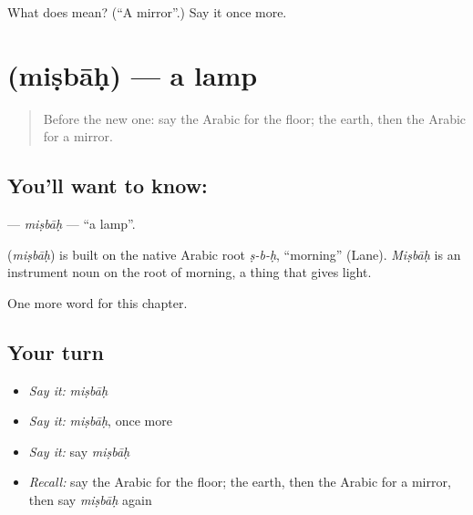\begin{tcolorbox}[breakable,colback=teal!4,colframe=teal!35!black,title={Before you move on}]
What does  mean? (\textquotedblleft{}A mirror\textquotedblright{}.) Say it once more.
\end{tcolorbox}
\section[\texorpdfstring{\ar{مصباح} (miṣbāḥ)}{مصباح (miṣbāḥ)}]{ (miṣbāḥ) — a lamp}

\label{lesson:AR-C71-misbah}



\begin{quote}
Before the new one: say the Arabic for the floor; the earth, then the Arabic for a mirror.
\end{quote}

\subsection*{You'll want to know: }
\textbf{} — \emph{miṣbāḥ} — \textquotedblleft{}a lamp\textquotedblright{}.

\begin{cousinweb}
\textbf{} (\emph{miṣbāḥ}) is built on the native Arabic root \emph{ṣ-b-ḥ}, \textquotedblleft{}morning\textquotedblright{} (Lane). \emph{Miṣbāḥ} is an instrument noun on the root of morning, a thing that gives light.
\end{cousinweb}

\begin{grammarlens}[title={What you've built}]
One more word for this chapter.
\end{grammarlens}

\subsection*{Your turn}
\begin{itemize}
\raggedright
  \item \emph{Say it:} \emph{miṣbāḥ}
  \item \emph{Say it:} \emph{miṣbāḥ}, once more
  \item \emph{Say it:} say \emph{miṣbāḥ}
  \item \emph{Recall:} say the Arabic for the floor; the earth, then the Arabic for a mirror, then say \emph{miṣbāḥ} again
\end{itemize}

